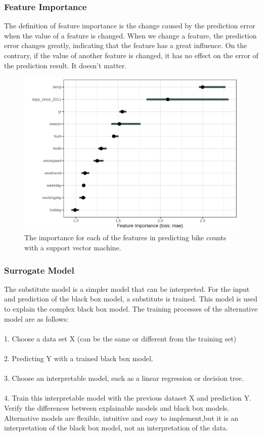 \subsubsection{Feature Importance}
The definition of feature importance is the change caused by the prediction error when the value of a feature is changed. When we change a feature, the prediction error changes greatly, indicating that the feature has a great influence. On the contrary, if the value of another feature is changed, it has no effect on the error of the prediction result. It doesn't matter.
\begin{figure}[H]
\centering
\includegraphics[width=0.6\columnwidth]{gfx/importance-bike-1.png}
\caption{The importance for each of the features in predicting bike counts with a support vector machine.~\cite{molnar2019}}
\label{fig:importance}
\end{figure}

\subsubsection{Surrogate Model}
The substitute model is a simpler model that can be interpreted. For the input and prediction of the black box model, a substitute is trained. This model is used to explain the complex black box model.
The training processes of the alternative model are as follows:
\\\\1. Choose a data set X (can be the same or different from the training set)
\\\\2. Predicting Y with a trained black box model.
\\\\3. Choose an interpretable model, such as a linear regression or decision tree.
\\\\4. Train this interpretable model with the previous dataset X and prediction Y.
Verify the differences between explainable models and black box models. Alternative models are flexible, intuitive and easy to implement,but it is an interpretation of the black box model, not an interpretation of the data.

